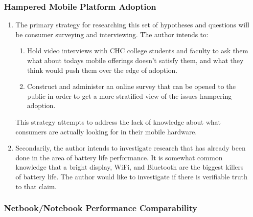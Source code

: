 \documentclass[12pt,oneside,letterpaper,titlepage]{article}
\begin{document}
\subsubsection{Hampered Mobile Platform Adoption}

\begin{enumerate}

\item The primary strategy for researching this set of hypotheses and questions
  will be consumer surveying and interviewing.  The author intends to:

  \begin{enumerate}

  \item Hold video interviews with CHC college students and faculty to ask them
    what about todays mobile offerings doesn't satisfy them, and what they think
    would push them over the edge of adoption.

  \item Construct and administer an online survey that can be opened to the
    public in order to get a more stratified view of the issues hampering
    adoption.

  \end{enumerate}

  This strategy attempts to address the lack of knowledge about what consumers
  are actually looking for in their mobile hardware.

\item Secondarily, the author intends to investigate research that has already
  been done in the area of battery life performance.  It is somewhat common
  knowledge that a bright display, WiFi, and Bluetooth are the biggest killers
  of battery life.  The author would like to investigate if there is verifiable
  truth to that claim.

\end{enumerate}

\subsubsection{Netbook/Notebook Performance Comparability}
\end{document}
